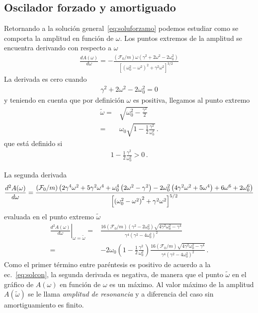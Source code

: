 \subsection{Oscilador forzado y amortiguado}
\begin{frame}
Retornando a la solución general~\eqref{eq:soluforzamo} podemos estudiar como se comporta la amplitud en función de $\omega$. Los puntos extremos de la amplitud se encuentra derivando con respecto a $\omega$
\begin{align*}
\frac{d A(\omega)}{d\omega}=
  -\frac{(\mathcal{F}_0/m) \omega  \left(\gamma^2+2 \omega^2-2 \omega_0^2\right)}{
  \left[\left(\omega_0^2-\omega^2\right)^2+\gamma^2\omega^2\right]^{3/2}}
\end{align*}
La derivada es cero cuando
\begin{align*}
  \gamma^2+2 \omega^2-2 \omega_0^2=0
\end{align*}
y teniendo en cuenta que por definición $\omega$ es positiva, llegamos al punto extremo
\begin{align*}
  \tilde\omega=&\sqrt{\omega _0^2-\frac{\gamma^2}{2}}\nonumber\\
=&\omega_0\sqrt{1-\frac{1}{2}\frac{\gamma^2}{\omega_0^2}}\,.
\end{align*}
que está definido si
\begin{align}
  \label{eq:solcon}
  1-\frac{1}{2}\frac{\gamma^2}{\omega_0^2}>0\,.
\end{align}

La segunda derivada
\begin{align*}
  \frac{d^2A(\omega)}{d\omega}=
\frac{(\mathcal{F}_0/m) \left(2 \gamma ^4 \omega
   ^2+5 \gamma ^2 \omega ^4+\omega
   _0^4 \left(2 \omega ^2-\gamma
   ^2\right)-2 \omega _0^2 \left(4
   \gamma ^2 \omega ^2+5 \omega
   ^4\right)+6 \omega ^6+2 \omega
   _0^6\right)}{%
\left[\left(\omega_0^2-\omega^2\right)^2+\gamma^2\omega^2\right]^{5/2}}
\end{align*}
evaluada en el punto extremo $\tilde\omega$
\begin{align*}
  \left.\frac{d^2A(\omega)}{d\omega}\right|_{\omega=\tilde\omega}=&
  \frac{16 (\mathcal{F}_0/m) \left(\gamma^2-2 \omega_0^2\right) \sqrt{4 \gamma^2\omega_0^2-\gamma^4}}{
  \gamma^4 \left(\gamma^2-4 \omega_0^2\right)^2}\nonumber\\
=&
  -2\omega_0\left(1-\frac{1}{2}\frac{\gamma^2}{\omega_0^2}\right)\frac{16 (\mathcal{F}_0/m)  \sqrt{4 \gamma^2\omega_0^2-\gamma^4}}{\gamma^4 \left(\gamma^2-4 \omega_0^2\right)^2}\,.
\end{align*}
Como el primer término entre paréntesis es positivo de acuerdo a la ec.~\eqref{eq:solcon}, la segunda derivada es negativa, de manera que el punto $\tilde\omega$ en el gráfico de $A(\omega)$ en función de $\omega$ es un máximo. Al valor máximo de la amplitud $A(\tilde\omega)$ se le llama \emph{amplitud de resonancia} y a diferencia del caso sin amortiguamiento es finito.


\end{frame}
